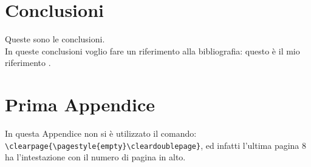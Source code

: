 \documentclass[12pt,a4paper,openright,twoside]{report}
\renewcommand{\chaptermark}[1]{\markboth{\thechapter.\ #1}{}}
\begin{document}
\chapter*{Conclusioni}
 Queste sono le
conclusioni.\\
In queste conclusioni voglio fare un riferimento alla
bibliografia: questo \`e il mio riferimento \cite{K3,K4}.
\renewcommand{\chaptermark}[1]{\markright{\thechapter \ #1}{}}
\lhead[\fancyplain{}{\bfseries\thepage}]{\fancyplain{}{\bfseries\rightmark}}
\appendix                               %
\chapter{Prima Appendice}               %
In questa Appendice non si \`e utilizzato il comando:\\
\verb"\clearpage{\pagestyle{empty}\cleardoublepage}", ed infatti
l'ultima pagina 8 ha l'intestazione con il numero di pagina in
alto.
\end{document}
